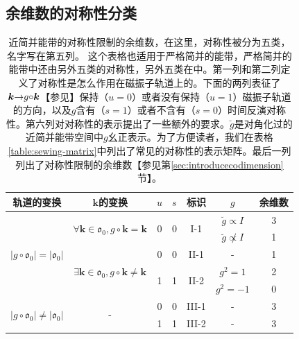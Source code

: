 \subsection{余维数的对称性分类}\label{sec:tenfold}

\begin{table}
\begin{tabular}{|c|c|c|c|c|c|c|}
\hline 
轨道的变换 & $\boldsymbol{k}$的变换 & $u$ & $s$  & 标识 & $g$ & 余维数\tabularnewline
\hline 
\multirow{5}{*}{$|g\circ\mathfrak{o}_{0}|=|\mathfrak{o}_{0}|$} & \multirow{2}{*}{$\forall\boldsymbol{k}\in\mathfrak{o}_{0},g\circ\boldsymbol{k}=\boldsymbol{k}$} & \multirow{2}{*}{0} & \multirow{2}{*}{0} & \multirow{2}{*}{I-1} & $\breve{g}\propto I$  & 3\tabularnewline
\cline{6-7} 
 &  &  &  &  & $\breve{g}\not\propto I$  & 1\tabularnewline
\cline{2-7} 
 & \multirow{3}{*}{$\exists\boldsymbol{k}\in\mathfrak{o}_{0},g\circ\boldsymbol{k}\neq\boldsymbol{k}$} & 0 & 0 & II-1 & - & 1\tabularnewline
\cline{3-7} 
 &  & \multirow{2}{*}{1} & \multirow{2}{*}{1} & \multirow{2}{*}{II-2} & $g^{2}=1$  & 2\tabularnewline
\cline{6-7} 
 &  &  &  &  & $g^{2}=-1$  & 0\tabularnewline
\hline 
\multirow{2}{*}{$|g\circ\mathfrak{o}_{0}|\neq|\mathfrak{o}_{0}|$ } & \multirow{2}{*}{-} & 0 & 0 & III-1 & - & 3\tabularnewline
\cline{3-7} 
 &  & 1 & 1 & III-2 & - & 3\tabularnewline
\hline 
\end{tabular}
\centering
\caption{近简并能带的对称性限制的余维数，在这里，对称性被分为五类，名字写在第五列。
这个表格也适用于严格简并的能带，严格简并的能带中还由另外五类的对称性，另外五类在中。第一列和第二列定义了对称性是怎么作用在磁振子轨道上的。下面的两列表征了$\boldsymbol{k}{\rightarrow}g{\circ}\boldsymbol{k}$【参见】保持（$u{=}0$）或者没有保持（$u{=}1$）磁振子轨道的方向，以及$g$含有（$s{=}1$）或者不含有（$s{=}0$）时间反演对称性。第六列对对称性的表示提出了一些额外的要求。$\breve{g}$是对角化过的近简并能带空间中$g$幺正表示。为了方便读者，我们在表格\ref{table:sewing-matrix}中列出了常见的对称性的表示矩阵。最后一列列出了对称性限制的余维数【参见第\ref{sec:introducecodimension}节】。\label{table:codimension-nearlydegen}}
\end{table}

